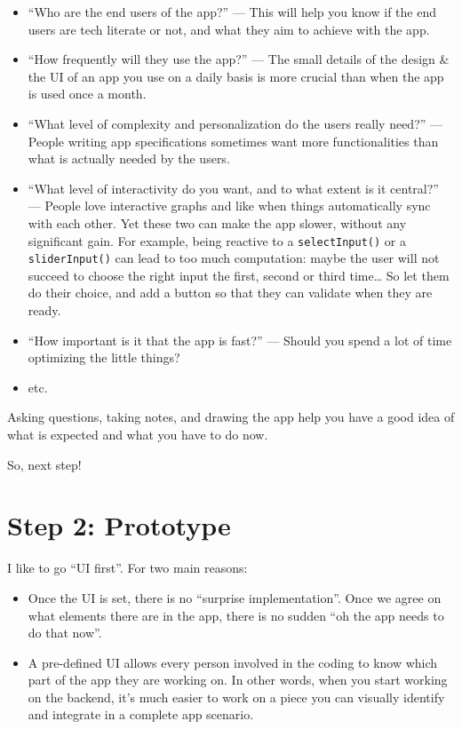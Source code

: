 \documentclass[]{book}
\providecommand{\tightlist}{%
  \setlength{\itemsep}{0pt}\setlength{\parskip}{0pt}}
\begin{document}
\begin{itemize}
\tightlist
\item
  ``Who are the end users of the app?'' --- This will help you know if the end users are tech literate or not, and what they aim to achieve with the app.
\item
  ``How frequently will they use the app?'' --- The small details of the design \& the UI of an app you use on a daily basis is more crucial than when the app is used once a month.
\item
  ``What level of complexity and personalization do the users really need?'' --- People writing app specifications sometimes want more functionalities than what is actually needed by the users.
\item
  ``What level of interactivity do you want, and to what extent is it central?'' --- People love interactive graphs and like when things automatically sync with each other. Yet these two can make the app slower, without any significant gain. For example, being reactive to a \texttt{selectInput()} or a \texttt{sliderInput()} can lead to too much computation: maybe the user will not succeed to choose the right input the first, second or third time\ldots{} So let them do their choice, and add a button so that they can validate when they are ready.
\item
  ``How important is it that the app is fast?'' --- Should you spend a lot of time optimizing the little things?
\item
  etc.
\end{itemize}

Asking questions, taking notes, and drawing the app help you have a good idea of what is expected and what you have to do now.

So, next step!

\hypertarget{step-protopype}{%
\chapter{Step 2: Prototype}\label{step-protopype}}

I like to go ``UI first''. For two main reasons:

\begin{itemize}
\tightlist
\item
  Once the UI is set, there is no ``surprise implementation''. Once we agree on what elements there are in the app, there is no sudden ``oh the app needs to do that now''.
\item
  A pre-defined UI allows every person involved in the coding to know which part of the app they are working on. In other words, when you start working on the backend, it's much easier to work on a piece you can visually identify and integrate in a complete app scenario.
\end{itemize}
\end{document}
